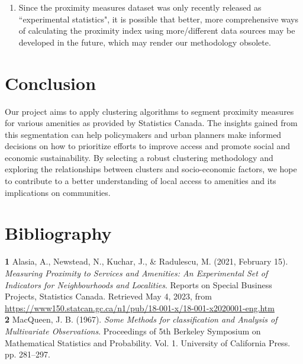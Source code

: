 \documentclass[11pt, a4paper]{article}
\begin{document}
\begin{enumerate}
\item Since the proximity measures dataset was only recently released as ``experimental statistics", it is possible that better, more comprehensive ways of calculating the proximity index using more/different data sources may be developed in the future, which may render our methodology obsolete.
\end{enumerate}





\section*{Conclusion}


Our project aims to apply clustering algorithms to segment proximity measures for various amenities as provided by Statistics Canada. The insights gained from this segmentation can help policymakers and urban planners make informed decisions on how to prioritize efforts to improve access and promote social and economic sustainability. By selecting a robust clustering methodology and exploring the relationships between clusters and socio-economic factors, we hope to contribute to a better understanding of local access to amenities and its implications on communities.






\section*{Bibliography}


\noindent\textbf{1} Alasia, A., Newstead, N., Kuchar, J., \& Radulescu, M. (2021, February 15). \textit{Measuring Proximity to Services and Amenities: An Experimental Set of Indicators for Neighbourhoods and Localities}. Reports on Special Business Projects, Statistics Canada. Retrieved May 4, 2023, from \sloppy\url{https://www150.statcan.gc.ca/n1/pub/18-001-x/18-001-x2020001-eng.htm}  \\

\noindent\textbf{2} MacQueen, J. B. (1967). \textit{Some Methods for classification and Analysis of Multivariate Observations}. Proceedings of 5th Berkeley Symposium on Mathematical Statistics and Probability. Vol. 1. University of California Press. pp. 281–297. \\ 
\end{document}
